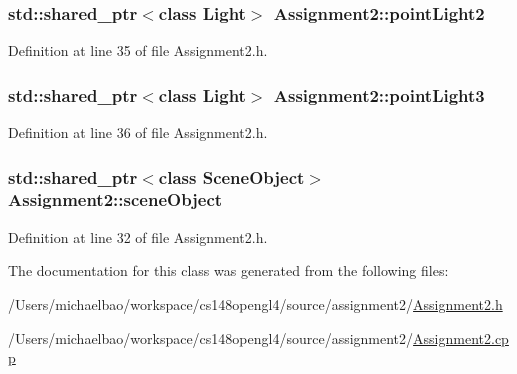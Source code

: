 \subsubsection[{point\+Light2}]{\setlength{\rightskip}{0pt plus 5cm}std\+::shared\+\_\+ptr$<$class {\bf Light}$>$ Assignment2\+::point\+Light2\hspace{0.3cm}{\ttfamily [private]}}\label{class_assignment2_adad4306da57243fada86a48e4edd7063}


Definition at line 35 of file Assignment2.\+h.

\hypertarget{class_assignment2_a23856ba0cbb408090482755bb636a567}{}
\subsubsection[{point\+Light3}]{\setlength{\rightskip}{0pt plus 5cm}std\+::shared\+\_\+ptr$<$class {\bf Light}$>$ Assignment2\+::point\+Light3\hspace{0.3cm}{\ttfamily [private]}}\label{class_assignment2_a23856ba0cbb408090482755bb636a567}


Definition at line 36 of file Assignment2.\+h.

\hypertarget{class_assignment2_a3afcc7cf71f0b1eb855482057beb1146}{}
\subsubsection[{scene\+Object}]{\setlength{\rightskip}{0pt plus 5cm}std\+::shared\+\_\+ptr$<$class {\bf Scene\+Object}$>$ Assignment2\+::scene\+Object\hspace{0.3cm}{\ttfamily [private]}}\label{class_assignment2_a3afcc7cf71f0b1eb855482057beb1146}


Definition at line 32 of file Assignment2.\+h.



The documentation for this class was generated from the following files\+:\begin{DoxyCompactItemize}
\item 
/\+Users/michaelbao/workspace/cs148opengl4/source/assignment2/\hyperlink{_assignment2_8h}{Assignment2.\+h}\item 
/\+Users/michaelbao/workspace/cs148opengl4/source/assignment2/\hyperlink{_assignment2_8cpp}{Assignment2.\+cpp}\end{DoxyCompactItemize}
